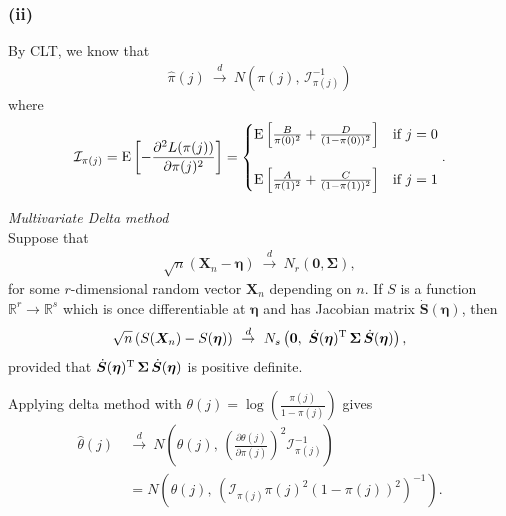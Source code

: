 \subsubsection*{(ii)}

By CLT, we know that
\begin{align*}
\widehat{\pi}(j) ~\overset{d}{\to}~ N\left(\pi(j), \, \mathcal{I}_{\pi(j)}^{-1}\right)
\end{align*}
where
\begin{align*}
\mathcal{I}_{\pi(j)} = \mathrm{E}\left[-\frac{\partial^{2} L(\pi(j))}{\partial \pi(j)^2}\right] =
\begin{cases}
\mathrm{E}\left[\frac{B}{\pi(0)^{2}} + \frac{D}{(1-\pi(0))^{2}}\right] & \text{if}~ j = 0\\
\\
\mathrm{E}\left[\frac{A}{\pi(1)^{2}} + \frac{C}{(1-\pi(1))^{2}}\right] & \text{if}~ j = 1
\end{cases}.
\end{align*}

\vspace{0.5cm}
\begin{framed}
\textit{Multivariate Delta method}\\

Suppose that
\begin{align*}
\sqrt{n}(\bm{X}_{n} - \bm{\eta}) ~\overset{d}{\to}~ N_{r}\left(\bm{0}, \bm{\Sigma}\right),
\end{align*}
for some $r$-dimensional random vector $\bm{X}_{n}$ depending on $n$. If $S$ is a function $\mathbb{R}^{r} \to \mathbb{R}^{s}$ which is once differentiable at $\bm{\eta}$ and has Jacobian matrix $\dot{\bm{S}}(\bm{\eta})$, then
\begin{align*}
\sqrt{n}\left(S(\bm{X}_{n}) - S(\bm{\eta})\right) ~\overset{d}{\to}~ N_{s}\left(\bm{0},~ \dot{\bm{S}}(\bm{\eta})^{\rm T} \, \bm{\Sigma} \, \dot{\bm{S}}(\bm{\eta})\right),
\end{align*}
provided that $\dot{\bm{S}}(\bm{\eta})^{\rm T} \, \bm{\Sigma} \, \dot{\bm{S}}(\bm{\eta})$ is positive definite.
\end{framed}

Applying delta method with $\theta(j) = \log\left(\frac{\pi(j)}{1-\pi(j)}\right)$ gives
\begin{align*}
\widehat{\theta}(j) ~&\overset{d}{\to}~ N\left(\theta(j), \, \left(\frac{\partial \theta(j)}{\partial \pi(j)}\right)^{2} \mathcal{I}_{\pi(j)}^{-1}\right)\\
&= N\left(\theta(j), \, \left(\mathcal{I}_{\pi(j)}\pi(j)^{2}\left(1-\pi(j)\right)^{2}\right)^{-1}\right).\\
\end{align*}

